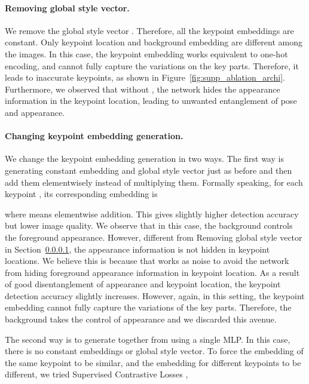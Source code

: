 \documentclass[10pt, conference, compsocconf]{IEEEtran}
\begin{document}
\paragraph{Removing global style vector.} \label{sec:supp_removing_global} We remove the global style vector . Therefore, all the keypoint embeddings are constant. Only keypoint location and background embedding are different among the images. In this case, the keypoint embedding works equivalent to one-hot encoding, and cannot fully capture the variations on the key parts. Therefore, it leads to inaccurate keypoints, as shown in Figure~\ref{fig:supp_ablation_archi}. Furthermore, we observed that without , the network hides the appearance information in the keypoint location, leading to unwanted entanglement of pose and appearance.


\paragraph{Changing keypoint embedding generation.} We change the keypoint embedding generation in two ways. The first way is generating constant embedding  and global style vector  just as before and then add them elementwisely instead of multiplying them. Formally speaking, for each keypoint , its corresponding embedding is

where  means elementwise addition. This gives slightly higher detection accuracy but lower image quality. We observe that in this case, the background controls the foreground appearance. However, different from Removing global style vector in Section~\ref{sec:supp_removing_global}, the appearance information is not hidden in keypoint locations. We believe this is because that  works as noise to avoid the network from hiding foreground appearance information in keypoint location. As a result of good disentanglement of appearance and keypoint location, the keypoint detection accuracy slightly increases. However, again, in this setting, the keypoint embedding cannot fully capture the variations of the key parts. Therefore, the background takes the control of appearance and we discarded this avenue.

\label{supp:contrastive_learning}
The second way is to generate  together from  using a single MLP. In this case, there is no constant embeddings or global style vector. To force the embedding of the same keypoint to be similar, and the embedding for different keypoints to be different, we tried Supervised Contrastive Losses \cite{khosla2020supervised},
\end{document}
